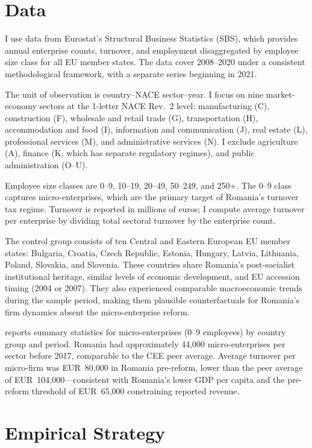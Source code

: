 \documentclass[12pt]{article}
\begin{document}
\section{Data}
\label{sec:data}

I use data from Eurostat's Structural Business Statistics (SBS), which provides annual enterprise counts, turnover, and employment disaggregated by employee size class for all EU member states. The data cover 2008--2020 under a consistent methodological framework, with a separate series beginning in 2021.

The unit of observation is country--NACE sector--year. I focus on nine market-economy sectors at the 1-letter NACE Rev.~2 level: manufacturing (C), construction (F), wholesale and retail trade (G), transportation (H), accommodation and food (I), information and communication (J), real estate (L), professional services (M), and administrative services (N). I exclude agriculture (A), finance (K, which has separate regulatory regimes), and public administration (O--U).

Employee size classes are 0--9, 10--19, 20--49, 50--249, and 250+. The 0--9 class captures micro-enterprises, which are the primary target of Romania's turnover tax regime. Turnover is reported in millions of euros; I compute average turnover per enterprise by dividing total sectoral turnover by the enterprise count.

The control group consists of ten Central and Eastern European EU member states: Bulgaria, Croatia, Czech Republic, Estonia, Hungary, Latvia, Lithuania, Poland, Slovakia, and Slovenia. These countries share Romania's post-socialist institutional heritage, similar levels of economic development, and EU accession timing (2004 or 2007). They also experienced comparable macroeconomic trends during the sample period, making them plausible counterfactuals for Romania's firm dynamics absent the micro-enterprise reform.



 reports summary statistics for micro-enterprises (0--9 employees) by country group and period. Romania had approximately 44,000 micro-enterprises per sector before 2017, comparable to the CEE peer average. Average turnover per micro-firm was EUR~80,000 in Romania pre-reform, lower than the peer average of EUR~104,000---consistent with Romania's lower GDP per capita and the pre-reform threshold of EUR~65,000 constraining reported revenue.


\section{Empirical Strategy}
\label{sec:strategy}
\end{document}
